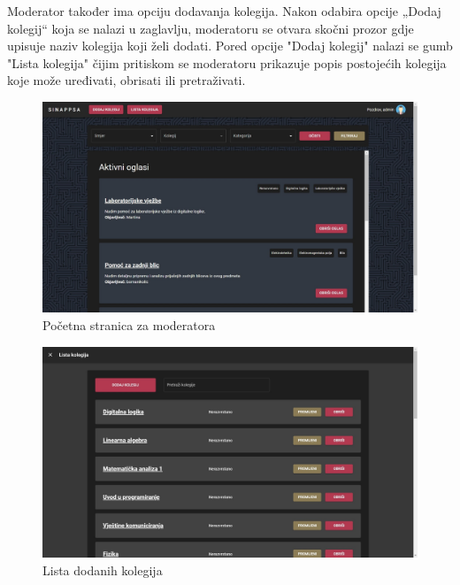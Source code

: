 			Moderator također ima opciju dodavanja kolegija. Nakon odabira opcije „Dodaj kolegij“ koja se nalazi u zaglavlju, moderatoru se otvara skočni prozor gdje upisuje naziv kolegija koji želi dodati. Pored opcije "Dodaj kolegij" nalazi se gumb "Lista kolegija" čijim pritiskom se moderatoru prikazuje popis postojećih kolegija koje može uređivati, obrisati ili pretraživati.
			
			\begin{figure}[H]
				\includegraphics[scale=0.37]{slike/moderator1.jpg} 
				\centering
				\caption{Početna stranica za moderatora}
				\label{fig:moderator1}
			\end{figure}
		
			\begin{figure}[H]
				\includegraphics[scale=0.37]{slike/kolegiji.jpg} 
				\centering
				\caption{Lista dodanih kolegija}
				\label{fig:kolegiji}
			\end{figure}
		

		
		
	
